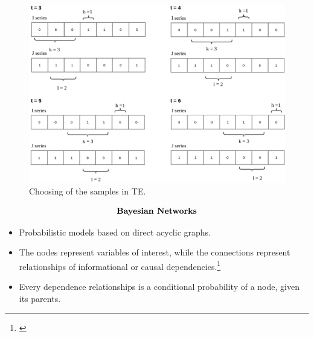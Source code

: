 \begin{frame}

    \begin{figure}[!h]
        \centering
        \includegraphics[scale=0.2]{figuras/te_sim.png}
        \caption{Choosing of the samples in TE.}
        \label{fig:te_sim}
    \end{figure}
\end{frame}

\begin{frame}
    \begin{align*}
        \centering \textbf{Bayesian Networks}
    \end{align*}
    \begin{itemize}
        \item Probabilistic models based on direct acyclic graphs.
        \item The nodes represent variables of interest, while the connections represent relationships of informational or causal dependencies.\footnote{\cite{pearl2011bayesian}}
        \item Every dependence relationships is a conditional probability of a node, given its parents.
    \end{itemize}
\end{frame}


